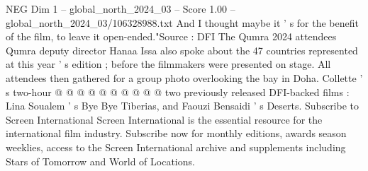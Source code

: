 \begin{textsample}{NEG Dim 1 – global\_north\_2024\_03 – Score 1.00 – global\_north\_2024\_03/106328988.txt}
And I thought maybe it ' s for the benefit of the film, to leave it open-ended."Source : DFI The Qumra 2024 attendees Qumra deputy director Hanaa Issa also spoke about the 47 countries represented at this year ' s edition ; before the filmmakers were presented on stage.
All attendees then gathered for a group photo overlooking the bay in Doha.
Collette ' s two-hour @ @ @ @ @ @ @ @ @ @ two previously released DFI-backed films : Lina Soualem ' s Bye Bye Tiberias, and Faouzi Bensaidi ' s Deserts.
Subscribe to Screen International Screen International is the essential resource for the international film industry.
Subscribe now for monthly editions, awards season weeklies, access to the Screen International archive and supplements including Stars of Tomorrow and World of Locations.

\end{textsample}
